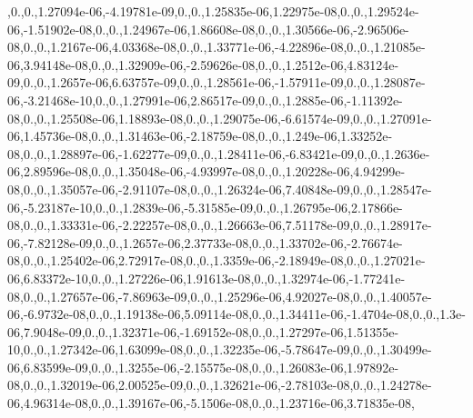 \begin{DoxyCompactItemize}
,0.,0.,1.\-27094e-\/06,-\/4.\-19781e-\/09,0.,0.,1.\-25835e-\/06,1.\-22975e-\/08,0.,0.,1.\-29524e-\/06,-\/1.\-51902e-\/08,0.,0.,1.\-24967e-\/06,1.\-86608e-\/08,0.,0.,1.\-30566e-\/06,-\/2.\-96506e-\/08,0.,0.,1.\-2167e-\/06,4.\-03368e-\/08,0.,0.,1.\-33771e-\/06,-\/4.\-22896e-\/08,0.,0.,1.\-21085e-\/06,3.\-94148e-\/08,0.,0.,1.\-32909e-\/06,-\/2.\-59626e-\/08,0.,0.,1.\-2512e-\/06,4.\-83124e-\/09,0.,0.,1.\-2657e-\/06,6.\-63757e-\/09,0.,0.,1.\-28561e-\/06,-\/1.\-57911e-\/09,0.,0.,1.\-28087e-\/06,-\/3.\-21468e-\/10,0.,0.,1.\-27991e-\/06,2.\-86517e-\/09,0.,0.,1.\-2885e-\/06,-\/1.\-11392e-\/08,0.,0.,1.\-25508e-\/06,1.\-18893e-\/08,0.,0.,1.\-29075e-\/06,-\/6.\-61574e-\/09,0.,0.,1.\-27091e-\/06,1.\-45736e-\/08,0.,0.,1.\-31463e-\/06,-\/2.\-18759e-\/08,0.,0.,1.\-249e-\/06,1.\-33252e-\/08,0.,0.,1.\-28897e-\/06,-\/1.\-62277e-\/09,0.,0.,1.\-28411e-\/06,-\/6.\-83421e-\/09,0.,0.,1.\-2636e-\/06,2.\-89596e-\/08,0.,0.,1.\-35048e-\/06,-\/4.\-93997e-\/08,0.,0.,1.\-20228e-\/06,4.\-94299e-\/08,0.,0.,1.\-35057e-\/06,-\/2.\-91107e-\/08,0.,0.,1.\-26324e-\/06,7.\-40848e-\/09,0.,0.,1.\-28547e-\/06,-\/5.\-23187e-\/10,0.,0.,1.\-2839e-\/06,-\/5.\-31585e-\/09,0.,0.,1.\-26795e-\/06,2.\-17866e-\/08,0.,0.,1.\-33331e-\/06,-\/2.\-22257e-\/08,0.,0.,1.\-26663e-\/06,7.\-51178e-\/09,0.,0.,1.\-28917e-\/06,-\/7.\-82128e-\/09,0.,0.,1.\-2657e-\/06,2.\-37733e-\/08,0.,0.,1.\-33702e-\/06,-\/2.\-76674e-\/08,0.,0.,1.\-25402e-\/06,2.\-72917e-\/08,0.,0.,1.\-3359e-\/06,-\/2.\-18949e-\/08,0.,0.,1.\-27021e-\/06,6.\-83372e-\/10,0.,0.,1.\-27226e-\/06,1.\-91613e-\/08,0.,0.,1.\-32974e-\/06,-\/1.\-77241e-\/08,0.,0.,1.\-27657e-\/06,-\/7.\-86963e-\/09,0.,0.,1.\-25296e-\/06,4.\-92027e-\/08,0.,0.,1.\-40057e-\/06,-\/6.\-9732e-\/08,0.,0.,1.\-19138e-\/06,5.\-09114e-\/08,0.,0.,1.\-34411e-\/06,-\/1.\-4704e-\/08,0.,0.,1.\-3e-\/06,7.\-9048e-\/09,0.,0.,1.\-32371e-\/06,-\/1.\-69152e-\/08,0.,0.,1.\-27297e-\/06,1.\-51355e-\/10,0.,0.,1.\-27342e-\/06,1.\-63099e-\/08,0.,0.,1.\-32235e-\/06,-\/5.\-78647e-\/09,0.,0.,1.\-30499e-\/06,6.\-83599e-\/09,0.,0.,1.\-3255e-\/06,-\/2.\-15575e-\/08,0.,0.,1.\-26083e-\/06,1.\-97892e-\/08,0.,0.,1.\-32019e-\/06,2.\-00525e-\/09,0.,0.,1.\-32621e-\/06,-\/2.\-78103e-\/08,0.,0.,1.\-24278e-\/06,4.\-96314e-\/08,0.,0.,1.\-39167e-\/06,-\/5.\-1506e-\/08,0.,0.,1.\-23716e-\/06,3.\-71835e-\/08,
\end{DoxyCompactItemize}
